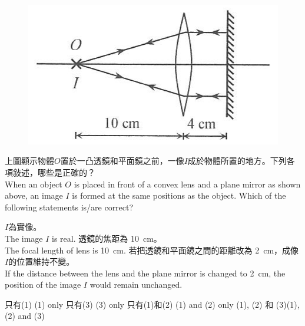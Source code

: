 \documentclass[beamer=true]{standalone}
\begin{document}
\begin{eg}
    \begin{figure}
        \centering
        \includegraphics[width=0.5\linewidth]{../../assets/dnu983.png}
    \end{figure}
    上圖顯示物體$O$置於一凸透鏡和平面鏡之前，一像$I$成於物體所置的地方。下列各項敍述，哪些是正確的？
    \\When an object $O$ is placed in front of a convex lens and a plane mirror as shown above, an image $I$ is formed at the same positions as the object. Which of the following statements is/are correct?

\end{eg}
\begin{eg}
    \begin{statements}[before-skip=.8em,after-item-skip=0em]
        \task $I$為實像。\\The image $I$ is real.
        \task 透鏡的焦距為 \qty{10}{cm}。\\The focal length of lens is \qty{10}{cm}.
        \task 若把透鏡和平面鏡之間的距離改為 \qty{2}{cm}，成像$I$的位置維持不變。\\If the distance between the lens and the plane mirror is changed to \qty{2}{cm}, the position of the image $I$ would remain unchanged.
    \end{statements}
    \begin{tasks} [before-skip=0em,after-item-skip=0.2em]
        \task 只有(1) \tab (1) only
        \task 只有(3) \tab (3) only
        \task 只有(1)和(2) \tab (1) and (2) only
        \task (1), (2) 和 (3)\tab (1), (2) and (3)
    \end{tasks}
\end{eg}
\end{document}
